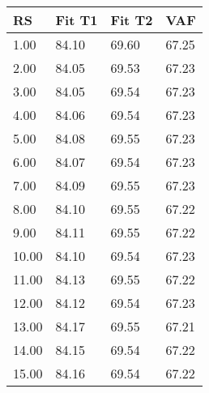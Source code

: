 \begin{tabular}{llll}
RS & Fit T1 & Fit T2 & VAF \\ 
\hline 
 1.00 & 84.10 & 69.60 & 67.25 \\ 
 2.00 & 84.05 & 69.53 & 67.23 \\ 
 3.00 & 84.05 & 69.54 & 67.23 \\ 
 4.00 & 84.06 & 69.54 & 67.23 \\ 
 5.00 & 84.08 & 69.55 & 67.23 \\ 
 6.00 & 84.07 & 69.54 & 67.23 \\ 
 7.00 & 84.09 & 69.55 & 67.23 \\ 
 8.00 & 84.10 & 69.55 & 67.22 \\ 
 9.00 & 84.11 & 69.55 & 67.22 \\ 
10.00 & 84.10 & 69.54 & 67.23 \\ 
11.00 & 84.13 & 69.55 & 67.22 \\ 
12.00 & 84.12 & 69.54 & 67.23 \\ 
13.00 & 84.17 & 69.55 & 67.21 \\ 
14.00 & 84.15 & 69.54 & 67.22 \\ 
15.00 & 84.16 & 69.54 & 67.22 \\ 
\hline 
\end{tabular}